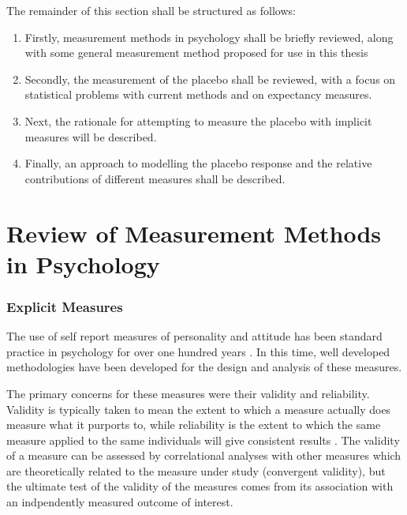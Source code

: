 The remainder of this section shall be structured as follows:
\begin{enumerate}
\item Firstly, measurement methods in psychology shall be briefly reviewed, along with some general measurement method proposed for use in this thesis 
\item Secondly, the measurement of the placebo shall be reviewed, with a focus on statistical problems with current methods and on expectancy measures.
\item Next, the rationale for attempting to measure the placebo with implicit measures will be described. 
\item Finally, an approach to modelling the placebo response and the relative contributions of different measures shall be described. 
\end{enumerate}



\section{Review of Measurement Methods in Psychology}
\label{sec:revi-meas-meth}

\subsubsection{Explicit Measures}

The use of self report measures of personality and attitude has been standard practice in psychology for over one hundred years \cite{spearman1904general}. In this time, well developed methodologies have been developed for the design and analysis of these measures.

The primary concerns for these measures were their validity and reliability.
Validity is typically taken to mean the extent to which a measure actually does measure what it purports to, while reliability is the extent to which the same measure applied to the same individuals will give consistent results \cite{raykov2010introduction}.  The validity of a measure can be assessed by correlational analyses with other measures which are theoretically related to the measure under study (convergent validity), but the ultimate test of the validity of the measures comes from its association with an indpendently measured outcome of interest. 

